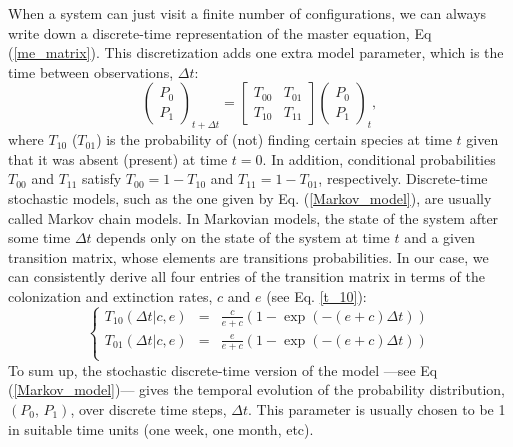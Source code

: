When a system can just visit a finite number of configurations, we can always write down a discrete-time representation of the master equation, Eq (\ref{me_matrix}). This discretization adds one extra model parameter, which is the time between observations, $\Delta t$:
\begin{equation}
\label{Markov_model}
\left(
\begin{array}{c}
P_0 \\ 
P_1
\end{array}
\right)_{t+\Delta t} = \left[\begin{array}{cc}
T_{00} & T_{01} \\
T_{10} & T_{11}
\end{array} 
\right]
\left(
\begin{array}{c}
P_0 \\ 
P_1 
\end{array}
\right)_{t},
\end{equation}
where $T_{10}$ ($T_{01}$) is the probability of (not) finding certain species at time $t$ given that it was absent (present) at time $t=0$. In addition, conditional probabilities $T_{00}$ and $T_{11}$ satisfy $T_{00}=1-T_{10}$ and $T_{11}=1-T_{01}$, respectively. Discrete-time stochastic models, such as the one given by Eq. (\ref{Markov_model}), are usually called Markov chain models. In Markovian models, the state of the system after some time $\Delta t$ depends only on the state of the system at time $t$ and a given transition matrix, whose elements are transitions probabilities. In our case, we can consistently derive all four entries of the transition matrix in terms of the colonization and extinction rates, $c$ and $e$ (see Eq. \eqref{t_10}):
\begin{equation}
\label{T_00}
\left\{
\begin{array}{ccc}      
T_{10}(\Delta t| c, e) &=&  \frac{c}{e+c} ( 1 - \exp(-(e+c)\Delta t) )\\  
T_{01}(\Delta t| c, e) &=&  \frac{e}{e+c} ( 1 - \exp(-(e+c)\Delta t) )\\
\end{array}
\right.
\end{equation} 
To sum up, the stochastic discrete-time version of the model ---see Eq (\ref{Markov_model})--- gives the temporal evolution of the probability distribution, $(P_0,\, P_1)$, over discrete time steps, $\Delta t$. This parameter is usually chosen to be 1 in suitable time units (one week, one month, etc). 
\bigskip

